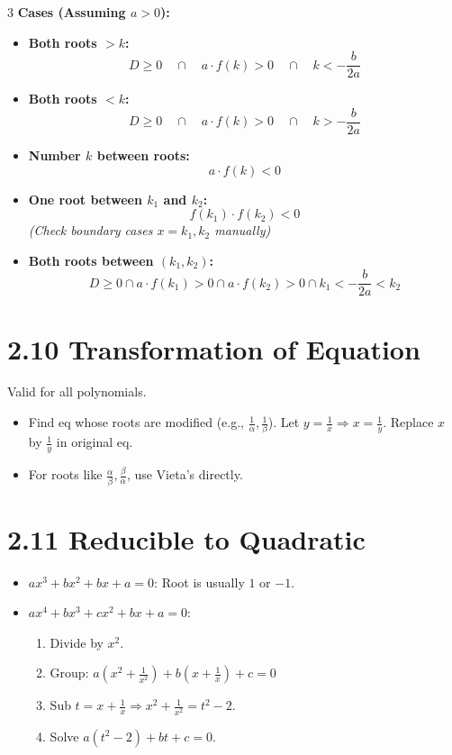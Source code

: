 \documentclass[11pt,a4paper,landscape]{article}
\begin{document}
\begin{multicols*}{3}
\textbf{Cases (Assuming $a>0$):}
\begin{itemize}
\item \textbf{Both roots $> k$:}
$$D \ge 0 \quad \cap \quad a \cdot f(k) > 0 \quad \cap \quad k < -\frac{b}{2a}$$
\item \textbf{Both roots $< k$:}
$$D \ge 0 \quad \cap \quad a \cdot f(k) > 0 \quad \cap \quad k > -\frac{b}{2a}$$
\item \textbf{Number $k$ between roots:}
$$a \cdot f(k) < 0$$
\item \textbf{One root between $k_1$ and $k_2$:}
$$f(k_1) \cdot f(k_2) < 0$$
\textit{(Check boundary cases $x=k_1, k_2$ manually)}
\item \textbf{Both roots between $(k_1, k_2)$:}
$$D \ge 0 \cap a \cdot f(k_1) > 0 \cap a \cdot f(k_2) > 0 \cap k_1 < -\frac{b}{2a} < k_2$$
\end{itemize}

\section*{2.10 Transformation of Equation}
Valid for all polynomials.
\begin{itemize}
\item Find eq whose roots are modified (e.g., $\frac{1}{\alpha}, \frac{1}{\beta}$). Let $y = \frac{1}{x} \Rightarrow x = \frac{1}{y}$. Replace $x$ by $\frac{1}{y}$ in original eq.
\item For roots like $\frac{\alpha}{\beta}, \frac{\beta}{\alpha}$, use Vieta's directly.
\end{itemize}

\section*{2.11 Reducible to Quadratic}
\begin{itemize}
\item $ax^3+bx^2+bx+a=0$: Root is usually $1$ or $-1$.
\item $ax^4+bx^3+cx^2+bx+a=0$:
\begin{enumerate}
\item Divide by $x^2$.
\item Group: $a\left(x^2+\frac{1}{x^2}\right) + b\left(x+\frac{1}{x}\right) + c = 0$
\item Sub $t = x+\frac{1}{x} \Rightarrow x^2+\frac{1}{x^2} = t^2-2$.
\item Solve $a(t^2-2) + bt + c = 0$.
\end{enumerate}
\end{itemize}

\end{multicols*}
\end{document}
